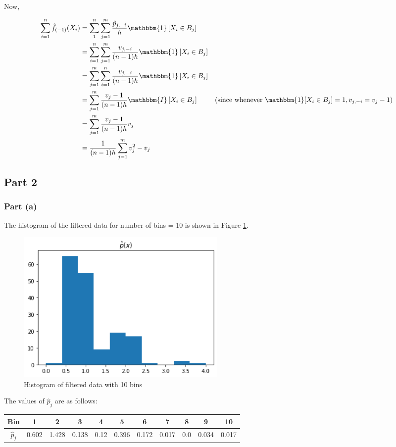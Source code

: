 Now, 

\begin{align*}
    \sum_{i=1}^n \hat{f}_{(-1)}(X_i) &= \sum_1^n \sum_{j=1}^m \frac{\hat{p}_{j, -i}}{h} \mathbbm{1}\left[X_i \in B_j\right] \\
    &= \sum_{i=1}^n\sum_{j=1}^m \frac{v_{j, -i}}{(n-1)h} \mathbbm{1}\left[X_i \in B_j\right] \\
    &= \sum_{j=1}^m \sum_{i=1}^n \frac{v_{j, -i}}{(n-1)h} \mathbbm{1}\left[X_i \in B_j\right] \\
    &= \sum_{j=1}^m \frac{v_{j}-1}{(n-1)h} \mathbbm{I}\left[X_i \in B_j\right] & (\text{since whenever }\mathbbm{1}[X_i \in B_j] = 1, v_{j, -i} = v_j - 1 ) \\
    &= \sum_{j=1}^m \frac{v_{j} -1}{(n-1)h} v_j \\
    &= \frac{1}{(n-1)h} \sum_{j=1}^m v_j^2 - v_j
\end{align*}

\subsection{Part 2}

\subsubsection{Part (a)}

The histogram of the filtered data for number of bins = 10 is shown in Figure \ref{fig:q1_2_a}.

\begin{figure}[H]
    \centering
    \includegraphics[width=0.5\textwidth]{../q1/images/10binhistogram.png}
    \caption{Histogram of filtered data with 10 bins}
    \label{fig:q1_2_a}
\end{figure}

The values of $\hat{p}_j$ are as follows:

\begin{tabular}
    { |c|c|c|c|c|c|c|c|c|c|c| }
    \hline
    Bin & 1 & 2 & 3 & 4 & 5 & 6 & 7 & 8 & 9 & 10 \\
    \hline
    $\hat{p}_j$ & 0.602 & 1.428 & 0.138 & 0.12 & 0.396 & 0.172 & 0.017 & 0.0 & 0.034 & 0.017 \\
    \hline
\end{tabular}

